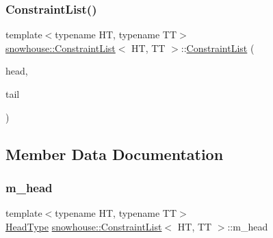 \subsubsection{\texorpdfstring{ConstraintList()}{ConstraintList()}}
{\footnotesize\ttfamily template$<$typename HT, typename TT$>$ \\
\mbox{\hyperlink{structsnowhouse_1_1ConstraintList}{snowhouse\+::\+Constraint\+List}}$<$ HT, TT $>$\+::\mbox{\hyperlink{structsnowhouse_1_1ConstraintList}{Constraint\+List}} (\begin{DoxyParamCaption}\item[{const \mbox{\hyperlink{structsnowhouse_1_1ConstraintList_ad278fa7aa3ea2ba58869dd4b8ed542bc}{Head\+Type}} \&}]{head,  }\item[{const \mbox{\hyperlink{structsnowhouse_1_1ConstraintList_adf892be082855aa10589d067cee68780}{Tail\+Type}} \&}]{tail }\end{DoxyParamCaption})\hspace{0.3cm}{\ttfamily [inline]}}



\subsection{Member Data Documentation}
\mbox{\label{structsnowhouse_1_1ConstraintList_a95613a2db0d7ed3d6009e601c970fcd3}} 
\subsubsection{\texorpdfstring{m\_head}{m\_head}}
{\footnotesize\ttfamily template$<$typename HT, typename TT$>$ \\
\mbox{\hyperlink{structsnowhouse_1_1ConstraintList_ad278fa7aa3ea2ba58869dd4b8ed542bc}{Head\+Type}} \mbox{\hyperlink{structsnowhouse_1_1ConstraintList}{snowhouse\+::\+Constraint\+List}}$<$ HT, TT $>$\+::m\+\_\+head}

\mbox{\label{structsnowhouse_1_1ConstraintList_af8d568d7aa57dc94a5945abe3989e55f}} 
